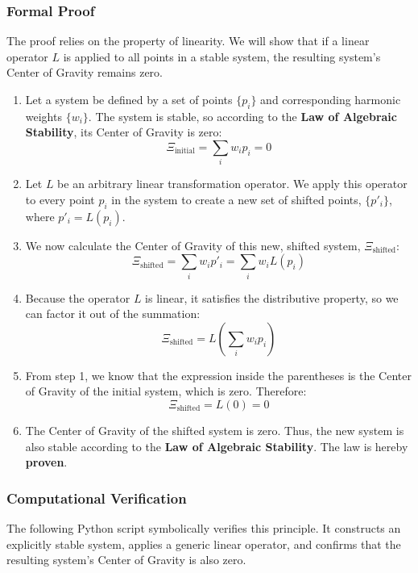 \subsubsection*{Formal Proof}
The proof relies on the property of linearity. We will show that if a linear operator $L$ is applied to all points in a stable system, the resulting system's Center of Gravity remains zero.

\begin{enumerate}
    \item Let a system be defined by a set of points $\{p_i\}$ and corresponding harmonic weights $\{w_i\}$. The system is stable, so according to the \textbf{Law of Algebraic Stability}, its Center of Gravity is zero:
    $$ \Xi_{\text{initial}} = \sum_{i} w_i p_i = 0 $$
    
    \item Let $L$ be an arbitrary linear transformation operator. We apply this operator to every point $p_i$ in the system to create a new set of shifted points, $\{p'_i\}$, where $p'_i = L(p_i)$.
    
    \item We now calculate the Center of Gravity of this new, shifted system, $\Xi_{\text{shifted}}$:
    $$ \Xi_{\text{shifted}} = \sum_{i} w_i p'_i = \sum_{i} w_i L(p_i) $$
    
    \item Because the operator $L$ is linear, it satisfies the distributive property, so we can factor it out of the summation:
    $$ \Xi_{\text{shifted}} = L\left(\sum_{i} w_i p_i\right) $$
    
    \item From step 1, we know that the expression inside the parentheses is the Center of Gravity of the initial system, which is zero. Therefore:
    $$ \Xi_{\text{shifted}} = L(0) = 0 $$
    
    \item The Center of Gravity of the shifted system is zero. Thus, the new system is also stable according to the \textbf{Law of Algebraic Stability}. The law is hereby \textbf{proven}.
\end{enumerate}

\subsubsection*{Computational Verification}
The following Python script symbolically verifies this principle. It constructs an explicitly stable system, applies a generic linear operator, and confirms that the resulting system's Center of Gravity is also zero.

